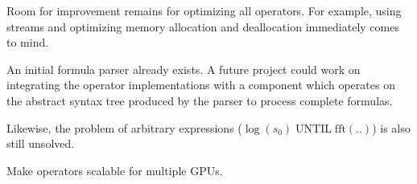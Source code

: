 \documentclass[a4paper,10pt]{article}
\begin{document}
Room for improvement remains for optimizing all operators. For example, using streams
and optimizing memory allocation and deallocation immediately comes to mind.

An initial formula parser already exists. A future project could work on integrating the operator implementations with a component which operates on the abstract syntax tree produced by the parser to process complete formulas.

Likewise, the problem of arbitrary expressions ($\log(s_0) \; \text{UNTIL} \; \text{fft}(..)$) is also still unsolved.

Make operators scalable for multiple GPUs.
\end{document}
